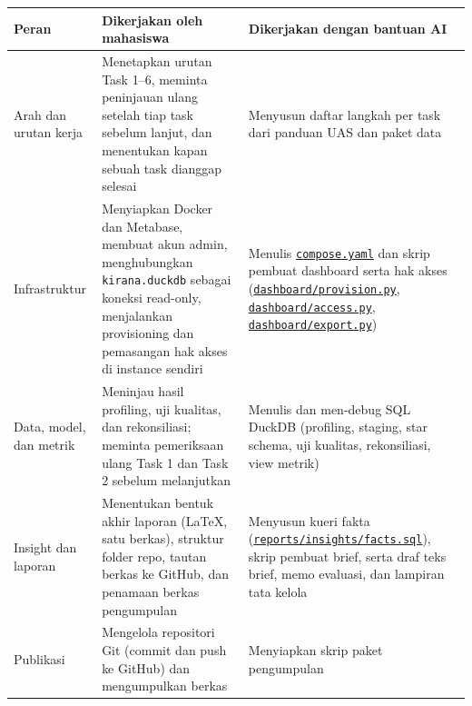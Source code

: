 \documentclass[10pt,a4paper]{article}
\begin{document}
{\def\LTcaptype{none} %
\begin{longtable}[]{@{}
  >{\raggedright\arraybackslash}p{}
  >{\raggedright\arraybackslash}p{}
  >{\raggedright\arraybackslash}p{}@{}}
\toprule\noalign{}
\begin{minipage}[b]{\linewidth}\raggedright
Peran
\end{minipage} & \begin{minipage}[b]{\linewidth}\raggedright
Dikerjakan oleh mahasiswa
\end{minipage} & \begin{minipage}[b]{\linewidth}\raggedright
Dikerjakan dengan bantuan AI
\end{minipage} \\
\midrule\noalign{}
\endhead
\bottomrule\noalign{}
\endlastfoot
Arah dan urutan kerja & Menetapkan urutan Task 1--6, meminta peninjauan ulang setelah tiap task sebelum lanjut, dan menentukan kapan sebuah task dianggap selesai & Menyusun daftar langkah per task dari panduan UAS dan paket data \\
Infrastruktur & Menyiapkan Docker dan Metabase, membuat akun admin, menghubungkan \texttt{kirana.duckdb} sebagai koneksi read-only, menjalankan provisioning dan pemasangan hak akses di instance sendiri & Menulis \href{https://github.com/titan2903/kirana-omnichannel-performance-intelligence/blob/master/compose.yaml}{\texttt{compose.yaml}} dan skrip pembuat dashboard serta hak akses (\href{https://github.com/titan2903/kirana-omnichannel-performance-intelligence/blob/master/dashboard/provision.py}{\texttt{dashboard/provision.py}}, \href{https://github.com/titan2903/kirana-omnichannel-performance-intelligence/blob/master/dashboard/access.py}{\texttt{dashboard/access.py}}, \href{https://github.com/titan2903/kirana-omnichannel-performance-intelligence/blob/master/dashboard/export.py}{\texttt{dashboard/export.py}}) \\
Data, model, dan metrik & Meninjau hasil profiling, uji kualitas, dan rekonsiliasi; meminta pemeriksaan ulang Task 1 dan Task 2 sebelum melanjutkan & Menulis dan men-debug SQL DuckDB (profiling, staging, star schema, uji kualitas, rekonsiliasi, view metrik) \\
Insight dan laporan & Menentukan bentuk akhir laporan (LaTeX, satu berkas), struktur folder repo, tautan berkas ke GitHub, dan penamaan berkas pengumpulan & Menyusun kueri fakta (\href{https://github.com/titan2903/kirana-omnichannel-performance-intelligence/blob/master/reports/insights/facts.sql}{\texttt{reports/insights/facts.sql}}), skrip pembuat brief, serta draf teks brief, memo evaluasi, dan lampiran tata kelola \\
Publikasi & Mengelola repositori Git (commit dan push ke GitHub) dan mengumpulkan berkas & Menyiapkan skrip paket pengumpulan \\
\end{longtable}
}
\end{document}
